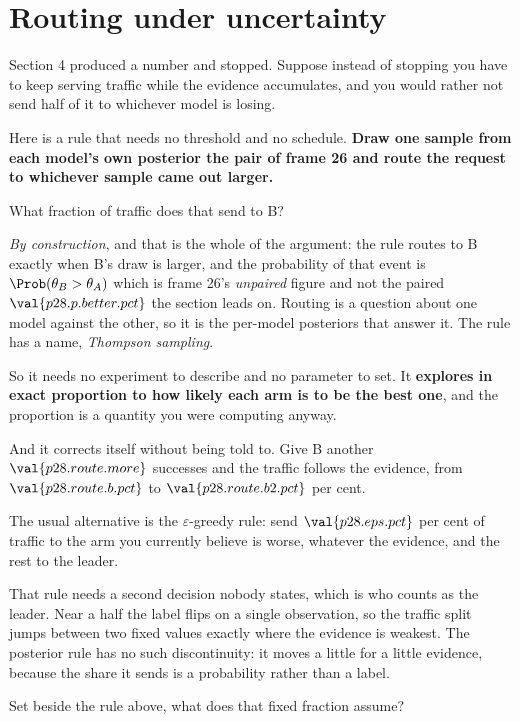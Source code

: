 \section{Routing under uncertainty}
\label{sec:P28-routing}

\begin{fr}
Section 4 produced a number and stopped. Suppose instead of stopping you have
to keep serving traffic while the evidence accumulates, and you would rather
not send half of it to whichever model is losing.

Here is a rule that needs no threshold and no schedule. \textbf{Draw one
sample from each model's own posterior \dash{} the pair of frame 26 \dash{}
and route the request to whichever sample came out larger.}

What fraction of traffic does that send to B?
\dotline
\nextframe
\end{fr}

\begin{fr}

\emph{By construction}, and that is the whole of the argument: the rule routes
to B exactly when B's draw is larger, and the probability of that event is
$\Prob(\theta_B > \theta_A)$ \dash{} which is frame 26's \emph{unpaired}
figure and not the paired $\val{p28.p.better.pct}$ the section leads on.
Routing is a question about one model against the other, so it is the
per-model posteriors that answer it. The rule has a name, \emph{Thompson
sampling}.

So it needs no experiment to describe and no parameter to set. It
\textbf{explores in exact proportion to how likely each arm is to be the best
one}, and the proportion is a quantity you were computing anyway.

\end{fr}

\begin{fr}
And it corrects itself without being told to. Give B another
$\val{p28.route.more}$ successes and the traffic follows the evidence, from
$\val{p28.route.b.pct}$ to $\val{p28.route.b2.pct}$ per cent.

The usual alternative is the $\varepsilon$-greedy rule: send
$\val{p28.eps.pct}$ per cent of traffic to the arm you currently believe is
worse, whatever the evidence, and the rest to the leader.

That rule needs a second decision nobody states, which is who counts as the
leader. Near a half the label flips on a single observation, so the traffic
split jumps between two fixed values exactly where the evidence is weakest.
The posterior rule has no such discontinuity: it moves a little for a little
evidence, because the share it sends is a probability rather than a label.

Set beside the rule above, what does that fixed fraction assume?
\dotline
\nextframe
\end{fr}

